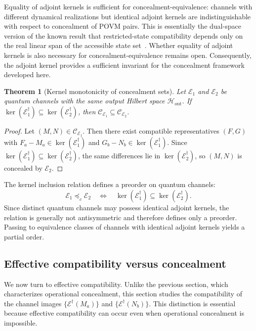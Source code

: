 \documentclass[
aps,pra,twocolumn,10pt,
superscriptaddress,longbibliography,floatfix
]{revtex4-2}
\newtheorem{theorem}{Theorem}[section]
\begin{document}
Equality of adjoint kernels is sufficient for concealment-equivalence: channels with different dynamical realizations but identical adjoint kernels are indistinguishable with respect to concealment of POVM pairs. This is essentially the dual-space version of the known result that restricted-state compatibility depends only on the real linear span of the accessible state set~\cite{Heinosaari2021FewStates}. Whether equality of adjoint kernels is also necessary for concealment-equivalence remains open. Consequently, the adjoint kernel provides a sufficient invariant for the concealment framework developed here.

\begin{theorem}[Kernel monotonicity of concealment sets]
\label{thm:kernel_monotonicity}
Let $\mathcal{E}_1$ and $\mathcal{E}_2$ be quantum channels with the same output Hilbert space $\mathcal{H}_{\mathrm{out}}$. If $\ker(\mathcal{E}_1^\dagger)\subseteq\ker(\mathcal{E}_2^\dagger)$, then $\mathcal{C}_{\mathcal{E}_1}\subseteq\mathcal{C}_{\mathcal{E}_2}$.
\end{theorem}

\begin{proof}
Let $(M,N)\in\mathcal{C}_{\mathcal{E}_1}$. Then there exist compatible representatives $(F,G)$ with $F_a-M_a\in\ker(\mathcal{E}_1^\dagger)$ and $G_b-N_b\in\ker(\mathcal{E}_1^\dagger)$. Since $\ker(\mathcal{E}_1^\dagger)\subseteq\ker(\mathcal{E}_2^\dagger)$, the same differences lie in $\ker(\mathcal{E}_2^\dagger)$, so $(M,N)$ is concealed by $\mathcal{E}_2$.
\end{proof}

The kernel inclusion relation defines a preorder on quantum channels:
\[
\mathcal E_1\preceq_c\mathcal E_2 \quad\Longleftrightarrow\quad \ker(\mathcal E_1^\dagger)\subseteq \ker(\mathcal E_2^\dagger).
\]
Since distinct quantum channels may possess identical adjoint kernels, the relation is generally not antisymmetric and therefore defines only a preorder. Passing to equivalence classes of channels with identical adjoint kernels yields a partial order.

\subsection{Effective compatibility versus concealment}

We now turn to effective compatibility. Unlike the previous section, which characterizes operational concealment, this section studies the compatibility of the channel images \(\{\mathcal{E}^\dagger(M_a)\}\) and \(\{\mathcal{E}^\dagger(N_b)\}\). This distinction is essential because effective compatibility can occur even when operational concealment is impossible.
\end{document}

